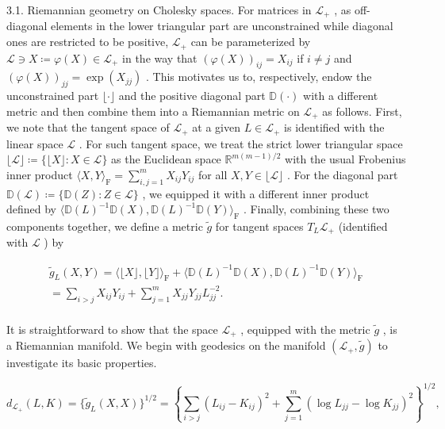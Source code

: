 \documentclass[11pt]{article}
\begin{document}
3.1. Riemannian geometry on Cholesky spaces. For matrices in  $\mathcal{L}_{+}$ , as off-diagonal elements in the lower triangular part are unconstrained while diagonal ones are restricted to be positive,  $\mathcal{L}_{+}$  can be parameterized by  $\mathcal{L} \ni X \coloneqq \varphi(X) \in \mathcal{L}_{+}$  in the way that  $(\varphi(X))_{ij} = X_{ij}$  if  $i \neq j$  and  $(\varphi(X))_{jj} = \exp(X_{jj})$ . This motivates us to, respectively, endow the unconstrained part  $\lfloor \cdot \rfloor$  and the positive diagonal part  $\mathbb{D}(\cdot)$  with a different metric and then combine them into a Riemannian metric on  $\mathcal{L}_{+}$  as follows. First, we note that the tangent space of  $\mathcal{L}_{+}$  at a given  $L \in \mathcal{L}_{+}$  is identified with the linear space  $\mathcal{L}$ . For such tangent space, we treat the strict lower triangular space  $\lfloor \mathcal{L} \rfloor \coloneqq \{\lfloor X \rfloor : X \in \mathcal{L}\}$  as the Euclidean space  $\mathbb{R}^{m(m-1)/2}$  with the usual Frobenius inner product  $\langle X, Y \rangle_{\mathrm{F}} = \sum_{i,j=1}^{m} X_{ij} Y_{ij}$  for all  $X, Y \in \lfloor \mathcal{L} \rfloor$ . For the diagonal part  $\mathbb{D}(\mathcal{L}) \coloneqq \{\mathbb{D}(Z) : Z \in \mathcal{L}\}$ , we equipped it with a different inner product defined by  $\langle \mathbb{D}(L)^{-1} \mathbb{D}(X), \mathbb{D}(L)^{-1} \mathbb{D}(Y) \rangle_{\mathrm{F}}$ . Finally, combining these two components together, we define a metric  $\tilde{g}$  for tangent spaces  $T_L \mathcal{L}_{+}$  (identified with  $\mathcal{L}$ ) by

$$
\begin{array}{l} \tilde {g} _ {L} (X, Y) = \langle \lfloor X \rfloor , \lfloor Y \rfloor \rangle_ {\mathrm {F}} + \langle \mathbb {D} (L) ^ {- 1} \mathbb {D} (X), \mathbb {D} (L) ^ {- 1} \mathbb {D} (Y) \rangle_ {\mathrm {F}} \\ = \sum_ {i > j} X _ {i j} Y _ {i j} + \sum_ {j = 1} ^ {m} X _ {j j} Y _ {j j} L _ {j j} ^ {- 2}. \\ \end{array}
$$

It is straightforward to show that the space  $\mathcal{L}_{+}$ , equipped with the metric  $\tilde{g}$ , is a Riemannian manifold. We begin with geodesics on the manifold  $(\mathcal{L}_{+},\tilde{g})$  to investigate its basic properties.

$$
d _ {\mathcal {L} _ {+}} (L, K) = \{\tilde {g} _ {L} (X, X) \} ^ {1 / 2} = \left\{\sum_ {i > j} (L _ {i j} - K _ {i j}) ^ {2} + \sum_ {j = 1} ^ {m} (\log L _ {j j} - \log K _ {j j}) ^ {2} \right\} ^ {1 / 2},
$$
\end{document}
